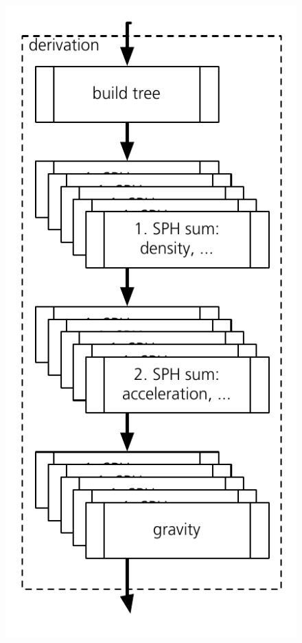 \begin{figure}[htbp]
\begin{center}
\includegraphics[scale=0.6]{22algo_sphlatch02.pdf}
\caption{}
\label{ch02_fig22}
\end{center}
\end{figure}



